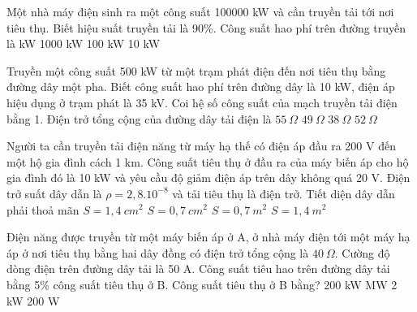\begin{vidu} %
	Một nhà máy điện sinh ra một công suất 100000 kW và cần truyền tải tới nơi tiêu thụ. Biết hiệu suất truyền tải là 90\%. Công suất hao phí trên đường truyền là
	\choice
	{ kW}
	{1000 kW}
	{100 kW}
	{10 kW}
\end{vidu}
\begin{vidu} %
	Truyền một công suất 500 kW từ một trạm phát điện đến nơi tiêu thụ bằng đường dây một pha. Biết công suất hao phí trên đường dây là 10 kW, điện áp hiệu dụng ở trạm phát là 35 kV. Coi hệ số công suất của mạch truyền tải điện bằng 1. Điện trở tổng cộng của đường dây tải điện là
	\choice
	{$55\ \Omega$}
	{\True $49\ \Omega$}
	{$38\ \Omega$}
	{$52\ \Omega$}
\end{vidu}
\begin{vidu} %
	Người ta cần truyền tải điện năng từ máy hạ thế có điện áp đầu ra 200 V đến một hộ gia đình cách 1 km. Công suất tiêu thụ ở đầu ra của máy biến áp cho hộ gia đình đó là 10 kW và yêu cầu độ giảm điện áp trên dây không quá 20 V. Điện trở suất dây dẫn là $\rho =2,8.10^{-8}$ và tải tiêu thụ là điện trở. Tiết diện dây dẫn phải thoả mãn
	\choice
	{\True $S = 1,4\ cm^2$}
	{$S = 0,7\ cm^2$}
	{$S = 0,7\ m^2$}
	{$S = 1,4\ m^2$}
\end{vidu}
\begin{vidu} %
	Điện năng được truyền từ một máy biến áp ở A, ở nhà máy điện tới một máy hạ áp ở nơi tiêu thụ bằng hai dây đồng có điện trở tổng cộng là $40\ \Omega$. Cường độ dòng điện trên đường dây tải là 50 A. Công suất tiêu hao trên đường dây tải bằng 5\% công suất tiêu thụ ở B. Công suất tiêu thụ ở B bằng?
	\choice
	{200 kW}
	{ MW}
	{2 kW}
	{200 W}
\end{vidu}
